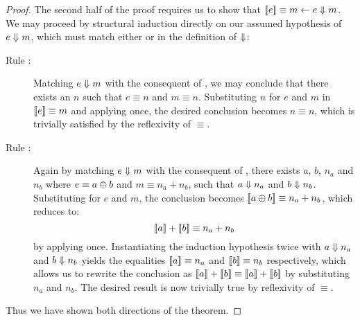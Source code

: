 \begin{proof}
\noindent The second half of the proof requires us to show that $\sb[e]
\equiv m \leftarrow e \Eval m$. We may proceed by structural induction
directly on our assumed hypothesis of $e \Downarrow m$, which must match
either  or  in the definition of
$\Downarrow$:
\begin{description}
\item[Rule :]%
Matching $e \Downarrow m$ with the consequent of , we may
conclude that there exists an $n$ such that $e \equiv n$ and $m \equiv n$.
Substituting $n$ for $e$ and $m$ in $\sb[e] \equiv m$ and applying
 once, the desired conclusion becomes $n \equiv n$, which
is trivially satisfied by the reflexivity of $\equiv$.
\item[Rule :]%
Again by matching $e \Downarrow m$ with the consequent of ,
there exists $a$, $b$, $n_a$ and $n_b$ where $e \equiv a \oplus b$ and $m
\equiv n_a + n_b$, such that $a \Downarrow n_a$ and $b \Downarrow n_b$.
Substituting for $e$ and $m$, the conclusion becomes $\sb[a \Add b] \equiv
n_a + n_b$, which reduces to:
\[
	\sb[a] + \sb[b] \equiv n_a + n_b
\]
by applying  once. Instantiating the induction
hypothesis twice with $a \Downarrow n_a$ and $b \Downarrow n_b$ yields the
equalities $\sb[a] \equiv n_a$ and $\sb[b] \equiv n_b$ respectively, which
allows us to rewrite the conclusion as $\sb[a] + \sb[b] \equiv \sb[a]
+ \sb[b]$ by substituting $n_a$ and $n_b$. The desired result is now
trivially true by reflexivity of $\equiv$.
\end{description}

\noindent Thus we have shown both directions of the theorem.
\end{proof}


